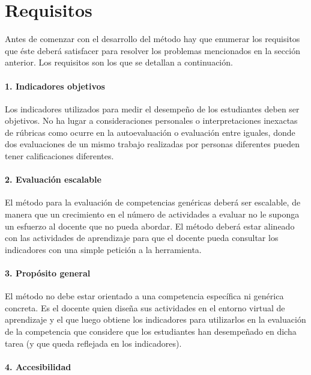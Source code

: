 \section{Requisitos} \label{pro:requisitos}

Antes de comenzar con el desarrollo del método hay que enumerar los requisitos que éste deberá satisfacer para resolver los problemas mencionados en la sección anterior. Los requisitos son los que se detallan a continuación.

\paragraph*{1. Indicadores objetivos}

Los indicadores utilizados para medir el desempeño de los estudiantes deben ser objetivos. No ha lugar a consideraciones personales o interpretaciones inexactas de rúbricas como ocurre en la autoevaluación o evaluación entre iguales, donde dos evaluaciones de un mismo trabajo realizadas por personas diferentes pueden tener calificaciones diferentes. 

\paragraph*{2. Evaluación escalable}

El método para la evaluación de competencias genéricas deberá ser escalable, de manera que un crecimiento en el número de actividades a evaluar no le suponga un esfuerzo al docente que no pueda abordar. El método deberá estar alineado con las actividades de aprendizaje para que el docente pueda consultar los indicadores con una simple petición a la herramienta.

\paragraph*{3. Propósito general}

El método no debe estar orientado a una competencia específica ni genérica concreta. Es el docente quien diseña sus actividades en el entorno virtual de aprendizaje y el que luego obtiene los indicadores para utilizarlos en la evaluación de la competencia que considere que los estudiantes han desempeñado en dicha tarea (y que queda reflejada en los indicadores). 

\paragraph*{4. Accesibilidad}

